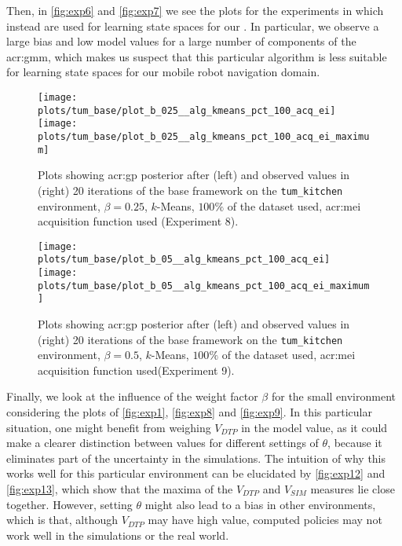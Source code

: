 Then, in \autoref{fig:exp6} and \autoref{fig:exp7} we see the plots for the experiments in which instead  are used for learning state spaces for our .
In particular, we observe a large bias and low model values for a large number of components of the \acrshort{acr:gmm}, which makes us suspect that this particular algorithm is less suitable for learning state spaces for our mobile robot navigation domain.

\begin{figure}[t!]
	\centering
	\texttt{[image: plots/tum\_base/plot\_b\_025\_\_alg\_kmeans\_pct\_100\_acq\_ei]}
	\texttt{[image: plots/tum\_base/plot\_b\_025\_\_alg\_kmeans\_pct\_100\_acq\_ei\_maximum]}
	\caption{Plots showing \acrshort{acr:gp} posterior after (left) and observed values in (right) 20 iterations of the base framework on the \texttt{tum\_kitchen} environment, $\beta = 0.25$, $k$-Means, $100\%$ of the dataset used, \acrshort{acr:mei} acquisition function used (Experiment 8).}
	\label{fig:exp8}
\end{figure}

\begin{figure}[t]
	\centering
	\texttt{[image: plots/tum\_base/plot\_b\_05\_\_alg\_kmeans\_pct\_100\_acq\_ei]}
	\texttt{[image: plots/tum\_base/plot\_b\_05\_\_alg\_kmeans\_pct\_100\_acq\_ei\_maximum]}
	\caption{Plots showing \acrshort{acr:gp} posterior after (left) and observed values in (right) 20 iterations of the base framework on the \texttt{tum\_kitchen} environment, $\beta = 0.5$, $k$-Means, $100\%$ of the dataset used, \acrshort{acr:mei} acquisition function used(Experiment 9).}
	\label{fig:exp9}
\end{figure}
	
Finally, we look at the influence of the weight factor $\beta$ for the small environment considering the plots of \autoref{fig:exp1}, \autoref{fig:exp8} and \autoref{fig:exp9}.
In this particular situation, one might benefit from weighing $V_\mathit{DTP}$ in the model value, as it could make a clearer distinction between values for different settings of $\theta$, because it eliminates part of the uncertainty in the simulations.
The intuition of why this works well for this particular environment can be elucidated by \autoref{fig:exp12} and \autoref{fig:exp13}, which show that the maxima of the $V_\mathit{DTP}$ and $V_\mathit{SIM}$ measures lie close together.
However, setting $\theta$ might also lead to a bias in other environments, which is that, although $V_\mathit{DTP}$ may have high value, computed policies may not work well in the simulations or the real world.

